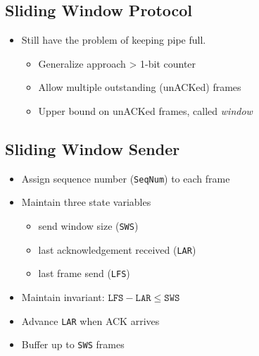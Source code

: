 \subsection{Sliding Window Protocol}
\begin{itemize}[nosep]
    \item Still have the problem of keeping pipe full.
          \begin{itemize}[nosep]
              \item Generalize approach > 1-bit counter
              \item Allow multiple outstanding (unACKed) frames
              \item Upper bound on unACKed frames, called \emph{window}
          \end{itemize}
\end{itemize}

\subsection{Sliding Window Sender}
\begin{itemize}[nosep]
    \item Assign sequence number (\texttt{SeqNum}) to each frame
    \item Maintain three state variables
          \begin{itemize}[nosep]
              \item send window size (\texttt{SWS})
              \item last acknowledgement received (\texttt{LAR})
              \item last frame send (\texttt{LFS})
          \end{itemize}
    \item Maintain invariant: $\texttt{LFS} - \texttt{LAR} \leq \texttt{SWS}$
    \item Advance \texttt{LAR} when ACK arrives
    \item Buffer up to \texttt{SWS} frames
\end{itemize}


